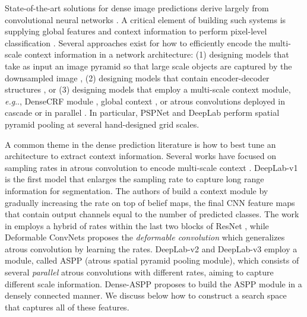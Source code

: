 \documentclass{article}
\makeatletter
\def\@onedot{\ifx\@let@token.\else.\null\fi\xspace}
\DeclareRobustCommand\onedot{\futurelet\@let@token\@onedot}
\def\eg{\emph{e.g}\onedot} \def\Eg{\emph{E.g}\onedot}
\makeatother
\begin{document}
State-of-the-art solutions for dense image predictions  derive largely from convolutional neural networks \cite{lecun1989backpropagation}. A critical element of building such systems is supplying global features and context information to perform pixel-level classification \cite{he2004multiscale,shotton2009textonboost,kohli2009robust,ladicky2009associative,gould2009decomposing, yao2012describing, mostajabi2014feedforward, dai2015convolutional, papandreou2018personlab}. Several approaches exist for how to efficiently encode the multi-scale context information in a network architecture: (1) designing models that take as input an image pyramid so that large scale objects are captured by the downsampled image \cite{farabet2013learning, pinheiro2014recurrent, eigen2015predicting, lin2015efficient, chen2015attention, chen2017deeplab}, (2) designing models that contain encoder-decoder structures \cite{badrinarayanan2015segnet, ronneberger2015u, lin2016refinenet, fu2017stacked, peng2017large, yu2018learning, zhang2018exfuse}, or (3) designing models that employ a multi-scale context module, \eg, DenseCRF module \cite{krahenbuhl2011efficient, bell2014material, chen2014semantic, zheng2015conditional, lin2015efficient, schwing2015fully}, global context \cite{liu2015parsenet, zhang2018context}, or atrous convolutions deployed in cascade \cite{liu2015semantic, yu2015multi, chen2017rethinking} or in parallel \cite{chen2017deeplab, chen2017rethinking}. In particular, PSPNet \cite{zhao2017pyramid} and DeepLab \cite{chen2017rethinking, deeplabv3plus2018} perform spatial pyramid pooling at several hand-designed grid scales.

A common theme in the dense prediction literature is how to best tune an architecture to extract context information. Several works have focused on sampling rates in atrous convolution to encode multi-scale context \cite{holschneider1989real,giusti2013fast,sermanet2013overfeat,papandreou2014untangling,chen2014semantic,yu2015multi,chen2017deeplab}. DeepLab-v1 \cite{chen2014semantic}
is the first model that enlarges the sampling rate to capture long range information for segmentation. The authors of \cite{yu2015multi} build a context module by gradually increasing the rate on top of belief maps, the final CNN feature maps that contain output channels equal to the number of predicted classes. The work in \cite{wang2017understanding} employs a hybrid of rates within the last two blocks of ResNet \cite{he2015deep}, while Deformable ConvNets \cite{dai2017deformable} proposes the \textit{deformable convolution} which generalizes atrous convolution by learning the rates. DeepLab-v2 \cite{chen2017deeplab} and DeepLab-v3 \cite{chen2017rethinking} employ a module, called ASPP (atrous spatial pyramid pooling module), which consists of several \textit{parallel} atrous convolutions with different rates, aiming to capture different scale information. Dense-ASPP \cite{yang2018denseaspp} proposes to build the ASPP module in a densely connected manner. We discuss below how to construct a search space that captures all of these features.
\end{document}
